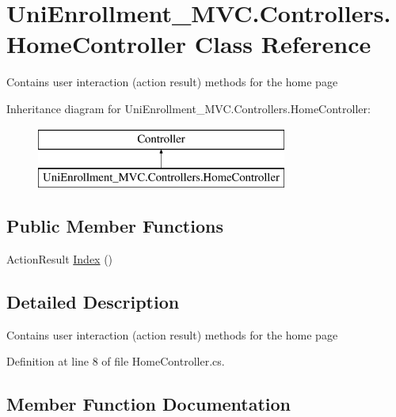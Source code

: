 \hypertarget{class_uni_enrollment___m_v_c_1_1_controllers_1_1_home_controller}{}\section{Uni\+Enrollment\+\_\+\+M\+V\+C.\+Controllers.\+Home\+Controller Class Reference}
\label{class_uni_enrollment___m_v_c_1_1_controllers_1_1_home_controller}


Contains user interaction (action result) methods for the home page  


Inheritance diagram for Uni\+Enrollment\+\_\+\+M\+V\+C.\+Controllers.\+Home\+Controller\+:\begin{figure}[H]
\begin{center}
\leavevmode
\includegraphics[height=2.000000cm]{class_uni_enrollment___m_v_c_1_1_controllers_1_1_home_controller}
\end{center}
\end{figure}
\subsection*{Public Member Functions}
\begin{DoxyCompactItemize}
\item 
Action\+Result \hyperlink{class_uni_enrollment___m_v_c_1_1_controllers_1_1_home_controller_aad4d2befa5bed0606d8152fab0f98681}{Index} ()
\end{DoxyCompactItemize}


\subsection{Detailed Description}
Contains user interaction (action result) methods for the home page 



Definition at line 8 of file Home\+Controller.\+cs.



\subsection{Member Function Documentation}
